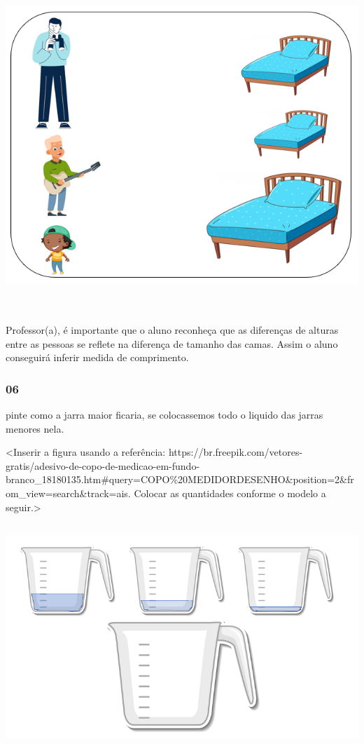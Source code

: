 \includegraphics[width=6.28790in,height=4.93257in]{media/image27.png}

Professor(a), é importante que o aluno reconheça que as diferenças de
alturas entre as pessoas se reflete na diferença de tamanho das camas.
Assim o aluno conseguirá inferir medida de comprimento.

\subsubsection{06}\label{section-32}

pinte como a jarra maior ficaria, se colocassemos todo o liquido das
jarras menores nela.

\protect\hypertarget{_heading=h.gjdgxs}{}{}\textless{}Inserir a figura
usando a referência:
https://br.freepik.com/vetores-gratis/adesivo-de-copo-de-medicao-em-fundo-branco\_18180135.htm\#query=COPO\%20MEDIDORDESENHO\&position=2\&from\_view=search\&track=ais.
Colocar as quantidades conforme o modelo a seguir.\textgreater{}

\includegraphics[width=5.90556in,height=3.37222in]{media/image28.png}

